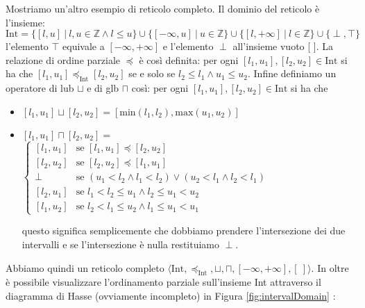 \begin{example}\label{ex:intervalDomain}
Mostriamo un'altro esempio di reticolo completo. Il dominio del reticolo è l'insieme:
\[\textrm{Int}=\{[l, u]\ |\ l, u\in\mathbb{Z} \wedge l\leq u\} \cup \{[-\infty, u]\ |\ u\in\mathbb{Z}\} \cup \{[l, +\infty]\ |\ l\in\mathbb{Z}\} \cup \{\perp, \top\}\]
l'elemento \(\top\) equivale a \([-\infty, +\infty]\) e l'elemento \(\perp\) all'insieme vuoto [ ].
La relazione di ordine parziale \(\preceq\) è così definita: per ogni \([l_1, u_1], [l_2, u_2]\in\textrm{Int}\) si ha che \([l_1, u_1]\preceq_{\textrm{Int}} [l_2, u_2]\) se e solo se \(l_2\leq l_1 \wedge u_1\leq u_2\). Infine definiamo un operatore di lub \(\sqcup\) e di glb \(\sqcap\) così: per ogni \([l_1, u_1], [l_2, u_2]\in\textrm{Int}\) si ha che 
\begin{itemize}
\item \([l_1, u_1]\sqcup [l_2, u_2] = [\textrm{min}(l_1, l_2), \textrm{max}(u_1, u_2)]\)
\item \([l_1, u_1]\sqcap [l_2, u_2] = \) 
	$
	\begin{cases}
	[l_1, u_1] & \textrm{se } [l_1, u_1]\preceq [l_2, u_2] \\
	[l_2, u_2] & \textrm{se } [l_2, u_2]\preceq [l_1, u_1] \\
	\perp      & \textrm{se } (u_1 < l_2 \wedge l_1 < l_2) \vee (u_2 < l_1 \wedge l_2 < l_1) \\
	[l_2, u_1] & \textrm{se } l_1<l_2\leq u_1 \wedge l_2\leq u_1<u_2 \\
	[l_1, u_2] & \textrm{se } l_2<l_1\leq u_2 \wedge l_1\leq u_1<u_1
	\end{cases} 
	$
 
    questo significa semplicemente che dobbiamo prendere l'intersezione dei due intervalli e se l'intersezione è nulla restituiamo \(\perp\).
\end{itemize}
Abbiamo quindi un reticolo completo \(\langle\textrm{Int}, \preceq_{\textrm{Int}}, \sqcup, \sqcap, [-\infty, +\infty], [\ ] \rangle\). In oltre è possibile visualizzare l'ordinamento parziale sull'insieme Int attraverso il diagramma di Hasse (ovviamente incompleto) in Figura \ref{fig:intervalDomain} :

\begin{figure}
\begin{center}
\begin{scriptsize}
\end{scriptsize}
\end{center}
\end{figure}
\end{example}

